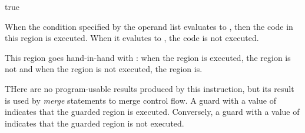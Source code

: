 \begin{instruction}{true}

  \begin{notes}
    When the condition specified by the operand list evaluates to
    , then the code in this region is executed.  When it
    evalutes to , the code is not executed.

    This region goes hand-in-hand with : when
    the  region is executed, the  region
    is not and when the  region is not executed, the
     region is.
  \end{notes}

  \begin{results}
  \item THere are no program-usable results produced by this
    instruction, but its result is used by \emph{merge} statements to
    merge control flow.  A guard with a value of  indicates
    that the guarded region is executed.  Conversely, a guard with a
    value of  indicates that the guarded region is not
    executed.
  \end{results}

  \begin{operands}
  \item {}
  \end{operands}

  \begin{seealso}
  \end{seealso}
\end{instruction}

